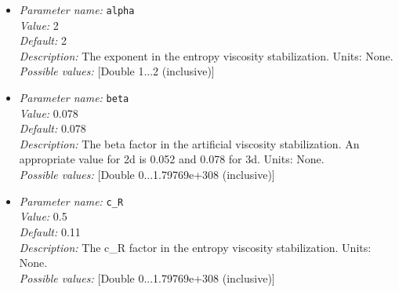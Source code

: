 \begin{itemize}
\item {\it Parameter name:} {\tt alpha}\\
{\it Value:} 2\\
{\it Default:} 2\\
{\it Description:} The exponent in the entropy viscosity stabilization. Units: None.\\
{\it Possible values:} [Double 1...2 (inclusive)]
\item {\it Parameter name:} {\tt beta}\\
{\it Value:} 0.078\\
{\it Default:} 0.078\\
{\it Description:} The beta factor in the artificial viscosity stabilization. An appropriate value for 2d is 0.052 and 0.078 for 3d. Units: None.\\
{\it Possible values:} [Double 0...1.79769e+308 (inclusive)]
\item {\it Parameter name:} {\tt c_R}\\
{\it Value:} 0.5\\
{\it Default:} 0.11\\
{\it Description:} The c_R factor in the entropy viscosity stabilization. Units: None.\\
{\it Possible values:} [Double 0...1.79769e+308 (inclusive)]
\end{itemize}
